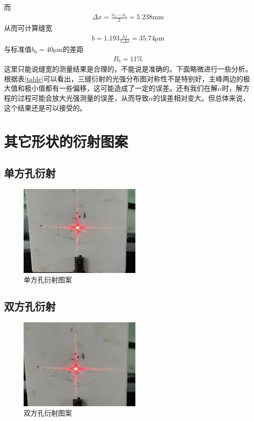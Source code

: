 \documentclass[a4paper]{ctexart}
\begin{document}
	而
	\begin{align}
		\Delta x=\frac{x_3-x_1}{2}=5.238\mathrm{mm}
	\end{align}
	从而可计算缝宽
	\begin{align}
		b=1.193\frac{\lambda z}{\pi \Delta x}=35.74\mathrm{\mu m}
	\end{align}
	与标准值$b_0=40\mathrm{\mu m}$的差距
	\begin{align}
		B_b=11\%
	\end{align}
	这里只能说缝宽的测量结果是合理的，不能说是准确的。下面略微进行一些分析。\\
	根据表\ref{table}可以看出，三缝衍射的光强分布图对称性不是特别好，主峰两边的极大值和极小值都有一些偏移，这可能造成了一定的误差。还有我们在解$\alpha$时，解方程的过程可能会放大光强测量的误差，从而导致$\alpha$的误差相对变大。但总体来说，这个结果还是可以接受的。
	\section{其它形状的衍射图案}
	\subsection{单方孔衍射}
	\begin{figure}[H]
		\centering
		\includegraphics[width=6cm]{1.jpg}
		\caption{单方孔衍射图案}
	\end{figure}
	\subsection{双方孔衍射}
	\begin{figure}[H]
		\centering
		\includegraphics[width=6cm]{2.jpg}
		\caption{双方孔衍射图案}
	\end{figure}
\end{document}
